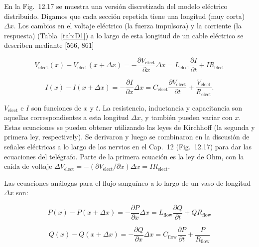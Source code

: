 \documentclass[12pt,a4paper]{book}
\begin{document}
En la Fig.~12.17 se muestra una versión discretizada del modelo eléctrico distribuido. Digamos que cada sección repetida tiene una longitud (muy corta) $\Delta x$. Los cambios en el voltaje eléctrico (la fuerza impulsora) y la corriente (la respuesta) (Tabla~\ref{tab:D1}) a lo largo de esta longitud de un cable eléctrico se describen mediante [566, 861]

\begin{equation}
V_{\text{elect}}(x) - V_{\text{elect}}(x + \Delta x) = -\frac{\partial V_{\text{elect}}}{\partial x} \Delta x = L_{\text{elect}} \frac{\partial I}{\partial t} + I R_{\text{elect}} \label{eq:D.8}
\end{equation}

\begin{equation}
I(x) - I(x + \Delta x) = -\frac{\partial I}{\partial x} \Delta x = C_{\text{elect}} \frac{\partial V_{\text{elect}}}{\partial t} + \frac{V_{\text{elect}}}{R_{\text{elect}}}. \label{eq:D.9}
\end{equation}

$V_{\text{elect}}$ e $I$ son funciones de $x$ y $t$. La resistencia, inductancia y capacitancia son aquellas correspondientes a esta longitud $\Delta x$, y también pueden variar con $x$. Estas ecuaciones se pueden obtener utilizando las leyes de Kirchhoff (la segunda y primera ley, respectively). Se derivaron y luego se combinaron en la discusión de señales eléctricas a lo largo de los nervios en el Cap.~12 (Fig.~12.17) para dar las ecuaciones del telégrafo. Parte de la primera ecuación es la ley de Ohm, con la caída de voltaje $\Delta V_{\text{elect}} = -(\partial V_{\text{elect}}/\partial x)\Delta x = I R_{\text{elect}}$.

Las ecuaciones análogas para el flujo sanguíneo a lo largo de un vaso de longitud $\Delta x$ son:

\begin{equation}
P(x) - P(x + \Delta x) = -\frac{\partial P}{\partial x} \Delta x = L_{\text{flow}} \frac{\partial Q}{\partial t} + Q R_{\text{flow}} \label{eq:D.10}
\end{equation}

\begin{equation}
Q(x) - Q(x + \Delta x) = -\frac{\partial Q}{\partial x} \Delta x = C_{\text{flow}} \frac{\partial P}{\partial t} + \frac{P}{R_{\text{flow}}} \label{eq:D.11}
\end{equation}
\end{document}
